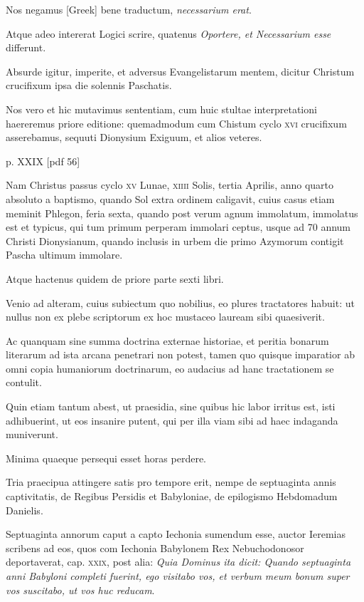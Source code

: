 \begin{parnumbers}
Nos negamus
\textgreek{[Greek]} bene traductum, \textit{necessarium erat}.

Atque adeo intererat Logici
scrire, quatenus \textit{Oportere, et Necessarium esse} differunt.

Absurde igitur, imperite, et adversus Evangelistarum mentem, dicitur
Christum crucifixum ipsa die solennis Paschatis.

Nos vero et
hic mutavimus sententiam, cum huic stultae interpretationi haereremus
priore editione: quemadmodum cum Chistum cyclo \textsc{xvi} crucifixum
asserebamus, sequuti Dionysium Exiguum, et alios veteres.

\clearpage
p. XXIX [pdf 56]

Nam Christus passus cyclo \textsc{xv} Lunae, \textsc{xiiii} Solis,
 tertia Aprilis,
anno quarto absoluto a baptismo, quando Sol extra ordinem caligavit,
cuius casus etiam meminit Phlegon, feria sexta, quando
post verum agnum immolatum, immolatus est et typicus, qui tum
primum perperam immolari ceptus, usque ad 70 annum Christi
Dionysianum, quando inclusis in urbem die primo Azymorum
contigit Pascha ultimum immolare.

Atque hactenus quidem de
priore parte sexti libri.

Venio ad alteram, cuius subiectum quo nobilius,
eo plures tractatores habuit: ut nullus non ex plebe scriptorum
ex hoc mustaceo lauream sibi quaesiverit.

Ac quanquam sine
summa doctrina externae historiae, et peritia bonarum literarum
ad ista arcana penetrari non potest, tamen quo quisque imparatior
ab omni copia humaniorum doctrinarum, eo audacius ad hanc
tractationem se contulit.

Quin etiam tantum abest, ut praesidia,
sine quibus hic labor irritus est, isti adhibuerint, ut eos insanire
putent, qui per illa viam sibi ad haec indaganda muniverunt.

Minima quaeque persequi esset horas perdere.

Tria praecipua attingere
satis pro tempore erit, nempe de septuaginta annis captivitatis,
de Regibus Persidis et Babyloniae, de epilogismo Hebdomadum
Danielis.

Septuaginta annorum caput a capto Iechonia sumendum
esse, auctor Ieremias scribens ad eos, quos com Iechonia Babylonem
Rex Nebuchodonosor deportaverat, cap. \textsc{xxix}, post
alia: \textit{Quia Dominus ita dicit: Quando septuaginta anni Babyloni completi
fuerint, ego visitabo vos, et verbum meum bonum super vos
suscitabo, ut vos huc reducam}.


\end{parnumbers}
